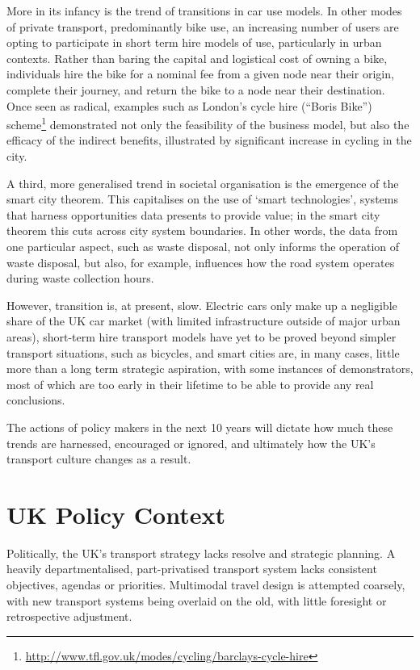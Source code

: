 \documentclass[conference]{IEEEtran}
\begin{document}
More in its infancy is the trend of transitions in car use models. In
other modes of private transport, predominantly bike use, an
increasing number of users are opting to participate in short term
hire models of use, particularly in urban contexts. Rather than baring
the capital and logistical cost of owning a bike, individuals hire the
bike for a nominal fee from a given node near their origin, complete
their journey, and return the bike to a node near their
destination. Once seen as radical, examples such as London's cycle
hire (``Boris Bike'')
scheme\footnote{\url{http://www.tfl.gov.uk/modes/cycling/barclays-cycle-hire}}
demonstrated not only the feasibility of the business model, but also
the efficacy of the indirect benefits, illustrated by significant
increase in cycling in the city.

A third, more generalised trend in societal organisation is the
emergence of the smart city theorem. This capitalises on the use of
`smart technologies', systems that harness opportunities data presents
to provide value; in the smart city theorem this cuts across city
system boundaries. In other words, the data from one particular
aspect, such as waste disposal, not only informs the operation of
waste disposal, but also, for example, influences how the road system
operates during waste collection hours.

However, transition is, at present, slow. Electric cars only make up a
negligible share of the UK car market (with limited infrastructure
outside of major urban areas), short-term hire transport models have
yet to be proved beyond simpler transport situations, such as
bicycles, and smart cities are, in many cases, little more than a long
term strategic aspiration, with some instances of demonstrators, most
of which are too early in their lifetime to be able to provide any
real conclusions.

The actions of policy makers in the next 10 years will dictate
how much these trends are harnessed, encouraged or ignored, and
ultimately how the UK's transport culture changes as a result.

\section{UK Policy Context}

Politically, the UK's transport strategy lacks resolve and strategic
planning. A heavily departmentalised, part-privatised transport system
lacks consistent objectives, agendas or priorities. Multimodal travel
design is attempted coarsely, with new transport systems being
overlaid on the old, with little foresight or retrospective
adjustment.
\end{document}
